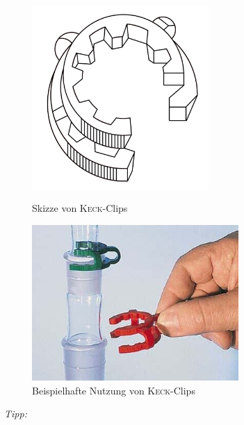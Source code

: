 \begin{figure}[h!]
	\begin{minipage}[b]{.4\textwidth} %
		\centering
		\includegraphics[width=0.6\textwidth]{img/keck_clips}
		\caption{Skizze von \textsc{Keck}-Clips}
	\end{minipage}
	\hspace{.1\linewidth}%
	\begin{minipage}[b]{.4\textwidth} %
		\centering
		\includegraphics[width=0.7\textwidth]{img/keck_clips_2}
		\caption{Beispielhafte Nutzung von \textsc{Keck}-Clips}
	\end{minipage}
\end{figure}
\FloatBarrier

\textit{Tipp:}\\
\vspace*{-5mm}


